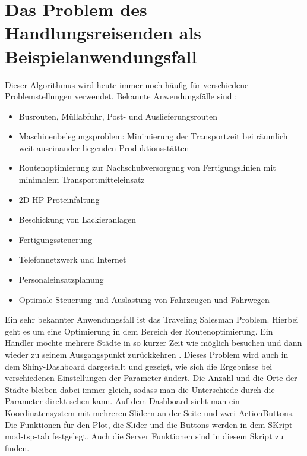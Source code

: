 \section{Das Problem des Handlungsreisenden als Beispielanwendungsfall}\label{chap:TSP}

Dieser Algorithmus wird heute immer noch häufig für verschiedene Problemstellungen verwendet. Bekannte Anwendungsfälle sind \citep[S.9]{Blum2003}:
\begin{itemize}
  \item Busrouten, Müllabfuhr, Post- und Auslieferungsrouten
  \item Maschinenbelegungsproblem: Minimierung der Transportzeit bei räumlich weit auseinander liegenden Produktionsstätten
  \item Routenoptimierung zur Nachschubversorgung von Fertigungslinien mit minimalem Transportmitteleinsatz 
  \item 2D HP Proteinfaltung
  \item Beschickung von Lackieranlagen
  \item Fertigungssteuerung
  \item Telefonnetzwerk und Internet
  \item Personaleinsatzplanung
  \item Optimale Steuerung und Auslastung von Fahrzeugen und Fahrwegen
  
\end{itemize}
Ein sehr bekannter Anwendungsfall ist das Traveling Salesman Problem. Hierbei geht es um eine Optimierung in dem Bereich der Routenoptimierung. Ein Händler möchte mehrere Städte in so kurzer Zeit wie möglich besuchen und dann wieder zu seinem Ausgangspunkt zurückkehren \citep[S.37]{OKWU.2021}.
\newline
\newline
Dieses Problem wird auch in dem Shiny-Dashboard dargestellt und gezeigt, wie sich die Ergebnisse bei verschiedenen Einstellungen der Parameter ändert. Die Anzahl und die Orte der Städte bleiben dabei immer gleich, sodass man die Unterschiede durch die Parameter direkt sehen kann.
\newline
Auf dem Dashboard sieht man ein Koordinatensystem mit mehreren Slidern an der Seite und zwei ActionButtons. Die Funktionen für den Plot, die Slider und die Buttons werden in dem SKript mod-tsp-tab festgelegt. Auch die Server Funktionen sind in diesem Skript zu finden.
